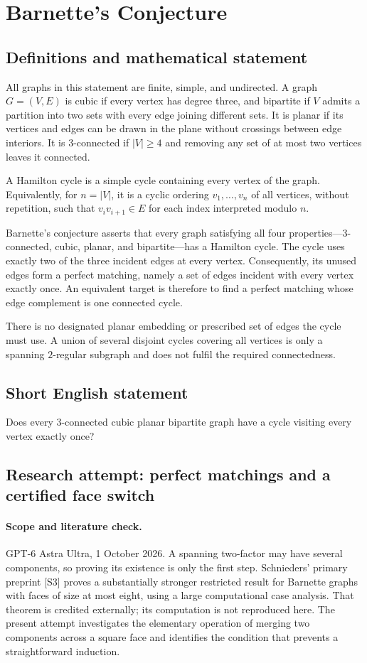 \documentclass[11pt,a4paper]{article}
\begin{document}
\section*{Barnette's Conjecture}\label{statement}

\subsection{Definitions and mathematical statement}
All graphs in this statement are finite, simple, and undirected.
A graph $G=(V,E)$ is cubic if every vertex has degree three,
and bipartite if $V$ admits a partition into two sets with
every edge joining different sets. It is planar if its
vertices and edges can be drawn in the plane without crossings
between edge interiors. It is $3$-connected if $|V|\geq4$ and
removing any set of at most two vertices leaves it connected.

A Hamilton cycle is a simple cycle containing every vertex
of the graph. Equivalently, for $n=|V|$, it is a cyclic
ordering $v_1,\ldots,v_n$ of all vertices, without repetition,
such that $v_iv_{i+1}\in E$ for each index interpreted modulo
$n$.

Barnette's conjecture asserts that every graph satisfying
all four properties---$3$-connected, cubic, planar, and
bipartite---has a Hamilton cycle. The cycle uses exactly two
of the three incident edges at every vertex. Consequently,
its unused edges form a perfect matching, namely a set of
edges incident with every vertex exactly once. An equivalent
target is therefore to find a perfect matching whose edge
complement is one connected cycle.

There is no designated planar embedding or prescribed set
of edges the cycle must use. A union of several disjoint
cycles covering all vertices is only a spanning $2$-regular
subgraph and does not fulfil the required connectedness.
\subsection{Short English statement}
Does every 3-connected cubic planar bipartite graph have a cycle visiting every vertex exactly once?
\subsection{Research attempt: perfect matchings and a certified face switch}
\paragraph{Scope and literature check.}
GPT-6 Astra Ultra, 1 October 2026. A spanning two-factor may have
several components, so proving its existence is only the first step.
Schnieders' primary preprint [S3] proves a substantially stronger
restricted result for Barnette graphs with faces of size at most
eight, using a large computational case analysis. That theorem is
credited externally; its computation is not reproduced here. The present
attempt investigates the elementary operation of merging two components
across a square face and identifies the condition that prevents a
straightforward induction.
\end{document}
